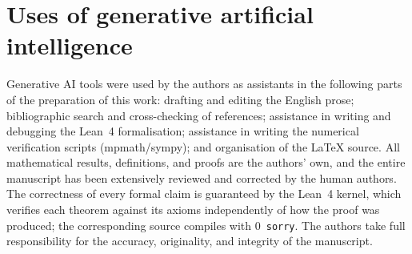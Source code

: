\documentclass[11pt]{amsart}
\theoremstyle{definition}
\begin{document}
\section*{Uses of generative artificial intelligence}

Generative AI tools were used by the authors as assistants in the
following parts of the preparation of this work: drafting and editing
the English prose; bibliographic search and cross-checking of
references; assistance in writing and debugging the Lean~4
formalisation; assistance in writing the numerical verification
scripts (mpmath/sympy); and organisation of the \LaTeX{} source.  All
mathematical results, definitions, and proofs are the authors' own,
and the entire manuscript has been extensively reviewed and corrected
by the human authors.  The correctness of every formal claim is
guaranteed by the Lean~4 kernel, which verifies each theorem against
its axioms independently of how the proof was produced; the
corresponding source compiles with $0$~\texttt{sorry}.  The authors
take full responsibility for the accuracy, originality, and integrity
of the manuscript.
\end{document}
